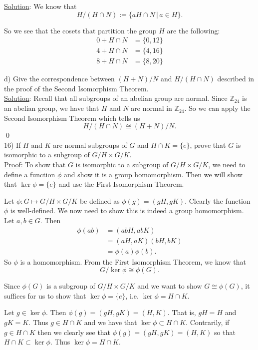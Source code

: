 \documentclass{article}
\begin{document}
\underline{Solution}: We know that
$$ H / (H \cap N) := \{ aH \cap N \, \vert \, a \in H \}.$$

So we see that the cosets that partition the group $H$ are the following:
\begin{align*}
	0 + H \cap N &= \{0, 12\} \\
	4 + H \cap N &= \{4, 16\}  \\
	8 + H \cap N &= \{8, 20\}
\end{align*}

d) Give the correspondence between $(H+N)/N$ and $H/(H \cap N)$ described in the proof of the Second Isomorphism Theorem. \\

\underline{Solution}: Recall that all subgroups of an abelian group are normal. Since $\mathbb{Z}_{24}$ is an abelian group, we have that $H$ and $N$ are normal in $\mathbb{Z}_{24}$. So we can apply the Second Isomorphism Theorem which tells us
$$H / (H \cap N) \cong (H+N) / N.$$ \qed \\

16) If $H$ and $K$ are normal subgroups of $G$ and $H \cap K = \{ {e} \}$, prove that $G$ is isomorphic to a subgroup of $G/H \times G/K$. \\

\underline{Proof}: To show that $G$ is isomorphic to a subgroup of $G/H \times G/K$, we need to define a function $\phi$ and show it is a group homomorphism. Then we will show that $\ker \phi = \{e\}$ and use the First Isomorphism Theorem.

Let $\phi : G \mapsto G/H \times G/K$ be defined as $\phi(g) = (gH, gK)$. Clearly the function $\phi$ is well-defined. We now need to show this is indeed a group homomorphism. Let $a, b \in G$. Then
\begin{align*}
	\phi(ab) &= (abH, abK) \\
	&= (aH, aK)(bH, bK) \\
	&= \phi(a)\phi(b).
\end{align*} So $\phi$ is a homomorphism. From the First Isomorphism Theorem, we know that 
$$G / \ker \phi \cong \phi(G).$$

Since $\phi(G)$ is a subgroup of $G/H \times G/K$ and we want to show $G \cong \phi(G)$, it suffices for us to show that $\ker \phi = \{ e \}$, i.e. $\ker \phi = H \cap K$. 

Let $g \in \ker \phi$. Then $\phi(g) = (gH, gK) = (H, K)$. That is, $gH = H$ and $gK = K$. Thus $g \in H \cap K$ and we have that $\ker \phi \subset H \cap K$. Contrarily, if $g \in H \cap K$ then we clearly see that $\phi(g) = (gH, gK) = (H, K)$ so that $H \cap K \subset \ker \phi$. Thus $\ker \phi = H \cap K$.
\end{document}
